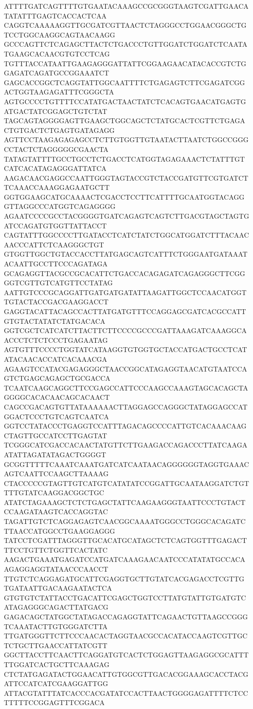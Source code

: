 ATTTTGATCAGTTTTGTGAATACAAAGCCGCGGGTAAGTCGATTGAACATATATTTGAGTCACCACTCAA
CAGGTCAAAAAGGTTGCGATCGTTAACTCTAGGGCCTGGAACGGGCTGTCCTGGCAAGGCAGTAACAAGG
GCCCAGTTCTCAGAGCTTACTCTGACCCTGTTGGATCTGGATCTCAATATGAAGCACAACGTGTCCTCAG
TGTTTACCATAATTGAAGAGGGATTATTCGGAAGAACATACACCGTCTGGAGATCAGATGCCGGAAATCT
GAGCACCGGCTCAGGTATTGGCAATTTTCTGAGAGTCTTCGAGATCGGACTGGTAAGAGATTTCGGGCTA
AGTGCCCCTGTTTTCCATATGACTAACTATCTCACAGTGAACATGAGTGATGACTATCGGAGCTGTCTAT
TAGCAGTAGGGGAGTTGAAGCTGGCAGCTCTATGCACTCGTTCTGAGACTGTGACTCTGAGTGATAGAGG
AGTTCCTAAGAGAGAGCCTCTTGTGGTTGTAATACTTAATCTGGCCGGGCCTACTCTAGGGGGCGAACTA
TATAGTATTTTGCCTGCCTCTGACCTCATGGTAGAGAAACTCTATTTGTCATCACATAGAGGGATTATCA
AAGACAACGAGGCCAATTGGGTAGTACCGTCTACCGATGTTCGTGATCTTCAAACCAAAGGAGAATGCTT
GGTGGAAGCATGCAAAACTCGACCTCCTTCATTTTGCAATGGTACAGGGTTAGGCCCATGGTCAGAGGGG
AGAATCCCCGCCTACGGGGTGATCAGAGTCAGTCTTGACGTAGCTAGTGATCCAGATGTGGTTATTACCT
CAGTATTTGGCCCCTTGATACCTCATCTATCTGGCATGGATCTTTACAACAACCCATTCTCAAGGGCTGT
GTGGTTGGCTGTACCACCTTATGAGCAGTCATTTCTGGGAATGATAAATACAATTGCCTTCCCAGATAGA
GCAGAGGTTACGCCGCACATTCTGACCACAGAGATCAGAGGGCTTCGGGGTCGTTGTCATGTTCCTATAG
AATTGTCCCGCAGGATTGATGATGATATTAAGATTGGCTCCAACATGGTTGTACTACCGACGAAGGACCT
GAGGTACATTACAGCCACTTATGATGTTTCCAGGAGCGATCACGCCATTGTGTACTATATCTATGACACA
GGTCGCTCATCATCTTACTTCTTCCCCGCCCGATTAAAGATCAAAGGCAACCCTCTCTCCCTGAGAATAG
AGTGTTTCCCCTGGTATCATAAGGTGTGGTGCTACCATGACTGCCTCATATACAACACCATCACAAACGA
AGAAGTCCATACGAGAGGGCTAACCGGCATAGAGGTAACATGTAATCCAGTCTGAGCAGAGCTGCGACCA
TCAATCAAGCAGGCTTCCGAGCCATTCCCAAGCCAAAGTAGCACAGCTAGGGGCACACAACAGCACAACT
CAGCCGACAGTGTTATAAAAAACTTAGGAGCCAGGGCTATAGGAGCCATGGACTCCCTGTCAGTCAATCA
GGTCCTATACCCTGAGGTCCATTTAGACAGCCCCATTGTCACAAACAAGCTAGTTGCCATCCTTGAGTAT
TCGGGCATCGACCACAACTATGTTCTTGAAGACCAGACCCTTATCAAGAATATTAGATATAGACTGGGGT
GCGGTTTTTCAAATCAAATGATCATCAATAACAGGGGGGTAGGTGAAACAGTCAATTCCAAGCTTAAAAG
CTACCCCCGTAGTTGTCATGTCATATATCCGGATTGCAATAAGGATCTGTTTTGTATCAAGGACGGCTGC
ATATCTAGAAAGCTCTCTGAGCTATTCAAGAAGGGTAATTCCCTGTACTCCAAGATAAGTCACCAGGTAC
TAGATTGTCTCAGGAGAGTCAACGGCAAAATGGGCCTGGGCACAGATCTTAACCATGGCCTGAAGGAGGG
TATCCTCGATTTAGGGTTGCACATGCATAGCTCTCAGTGGTTTGAGACTTTCCTGTTCTGGTTCACTATC
AAGACTGAAATGAGATCCATGATCAAAGAACAATCCCATATATGCCACAAGAGGAGGTATAACCCAACCT
TTGTCTCAGGAGATGCATTCGAGGTGCTTGTATCACGAGACCTCGTTGTGATAATTGACAAGAATACTCA
GTGTGTCTATTACCTGACATTCGAGCTGGTCCTTATGTATTGTGATGTCATAGAGGGCAGACTTATGACG
GAGACAGCTATGGCTATAGACCAGAGGTATTCAGAACTGTTAAGCCGGGTCAAATACTTGTGGGATCTTA
TTGATGGGTTCTTCCCAACACTAGGTAACGCCACATACCAAGTCGTTGCTCTGCTTGAACCATTATCGTT
GGCTTACCTTCAACTTCAGGATGTCACTCTGGAGTTAAGAGGCGCATTTTTGGATCACTGCTTCAAAGAG
CTCTATGAGATACTGGAACATTGTGGCGTTGACACGGAAAGCACCTACGATTCCATCATCGAAGGATTGG
ATTACGTATTTATCACCCACGATATCCACTTAACTGGGGAGATTTTCTCCTTTTTCCGGAGTTTCGGACA
